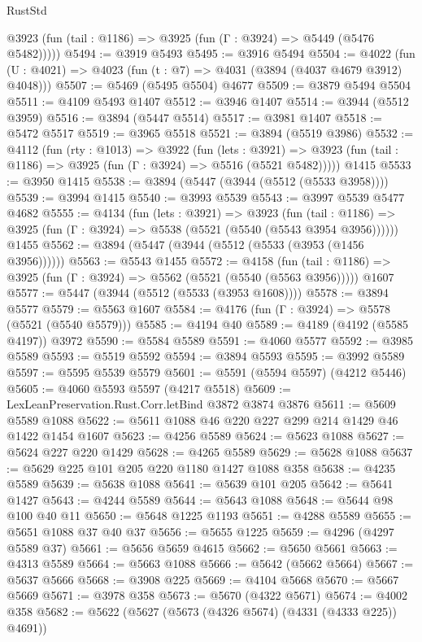 \begin{lexlean}{RustStd}
\begin{coremodule}
      @3923 (fun (tail : @1186) => @3925 (fun (Γ : @3924) => @5449 (@5476 @5482)))))
@5494 := @3919 @5493
@5495 := @3916 @5494
@5504 := @4022 (fun (U : @4021) => @4023 (fun (t : @7) => @4031 (@3894 (@4037 @4679 @3912) @4048)))
@5507 := @5469 (@5495 @5504) @4677
@5509 := @3879 @5494 @5504
@5511 := @4109 @5493 @1407
@5512 := @3946 @1407
@5514 := @3944 (@5512 @3959)
@5516 := @3894 (@5447 @5514)
@5517 := @3981 @1407
@5518 := @5472 @5517
@5519 := @3965 @5518
@5521 := @3894 (@5519 @3986)
@5532 := @4112
    (fun (rty : @1013) =>
    @3922
      (fun (lets : @3921) =>
      @3923 (fun (tail : @1186) => @3925 (fun (Γ : @3924) => @5516 (@5521 @5482)))))
    @1415
@5533 := @3950 @1415
@5538 := @3894 (@5447 (@3944 (@5512 (@5533 @3958))))
@5539 := @3994 @1415
@5540 := @3993 @5539
@5543 := @3997 @5539 @5477 @4682
@5555 := @4134
    (fun (lets : @3921) =>
    @3923
      (fun (tail : @1186) => @3925 (fun (Γ : @3924) => @5538 (@5521 (@5540 (@5543 @3954 @3956))))))
    @1455
@5562 := @3894 (@5447 (@3944 (@5512 (@5533 (@3953 (@1456 @3956))))))
@5563 := @5543 @1455
@5572 := @4158
    (fun (tail : @1186) => @3925 (fun (Γ : @3924) => @5562 (@5521 (@5540 (@5563 @3956)))))
    @1607
@5577 := @5447 (@3944 (@5512 (@5533 (@3953 @1608))))
@5578 := @3894 @5577
@5579 := @5563 @1607
@5584 := @4176 (fun (Γ : @3924) => @5578 (@5521 (@5540 @5579)))
@5585 := @4194 @40
@5589 := @4189 (@4192 (@5585 @4197)) @3972
@5590 := @5584 @5589
@5591 := @4060 @5577
@5592 := @3985 @5589
@5593 := @5519 @5592
@5594 := @3894 @5593
@5595 := @3992 @5589
@5597 := @5595 @5539 @5579
@5601 := @5591 (@5594 @5597) (@4212 @5446)
@5605 := @4060 @5593 @5597 (@4217 @5518)
@5609 := LexLeanPreservation.Rust.Corr.letBind @3872 @3874 @3876
@5611 := @5609 @5589 @1088
@5622 := @5611 @1088 @46 @220 @227 @299 @214 @1429 @46 @1422 @1454 @1607
@5623 := @4256 @5589
@5624 := @5623 @1088
@5627 := @5624 @227 @220 @1429
@5628 := @4265 @5589
@5629 := @5628 @1088
@5637 := @5629 @225 @101 @205 @220 @1180 @1427 @1088 @358
@5638 := @4235 @5589
@5639 := @5638 @1088
@5641 := @5639 @101 @205
@5642 := @5641 @1427
@5643 := @4244 @5589
@5644 := @5643 @1088
@5648 := @5644 @98 @100 @40 @11
@5650 := @5648 @1225 @1193
@5651 := @4288 @5589
@5655 := @5651 @1088 @37 @40 @37
@5656 := @5655 @1225
@5659 := @4296 (@4297 @5589 @37)
@5661 := @5656 @5659 @4615
@5662 := @5650 @5661
@5663 := @4313 @5589
@5664 := @5663 @1088
@5666 := @5642 (@5662 @5664)
@5667 := @5637 @5666
@5668 := @3908 @225
@5669 := @4104 @5668
@5670 := @5667 @5669
@5671 := @3978 @358
@5673 := @5670 (@4322 @5671)
@5674 := @4002 @358
@5682 := @5622 (@5627 (@5673 (@4326 @5674) (@4331 (@4333 @225)) @4691))

\end{coremodule}
\end{lexlean}
